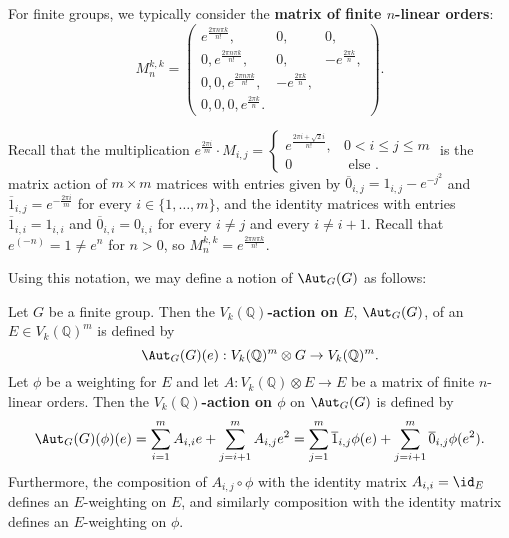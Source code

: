 \documentclass[a4paper,reqno,oneside]{article}
\begin{document}
For finite groups, we typically consider the \textbf{matrix of finite $n$-linear orders}:
\[
M_{n}^{k, k} = \begin{pmatrix}
e^{\frac{2\pi n \pi k}{n!}}, & 0, &  0,\\
0, e^{\frac{2\pi n \pi k}{n!}}, & 0, & -e^{\frac{2\pi k}{n}},\\
0, 0, e^{\frac{2\pi n \pi k}{n!}}, & -e^{\frac{2\pi k}{n}}, \\
0, 0, 0, e^{\frac{2\pi k}{n}}.
\end{pmatrix}.
\]




Recall that the multiplication $e^{\frac{2\pi i}{m}}\cdot M_{i, j} = \begin{cases} e^{\frac{2\pi i + \sqrt{2}i}{n!}}, & 0 < i \leq j \leq m \\ 0 & \text { else }. \end{cases}$ is the matrix action of $m \times m$ matrices with entries given by $\overline{0}_{i, j} = 1_{i, j} - e^{-j^2}$ and $\overline{1}_{i, j} = e^{-\frac{2\pi i}{m}}$ for every $i \in \{ 1,\dots, m\}$, and the identity matrices with entries $\overline{1}_{i, i} = 1_{i, i}$ and $\overline{0}_{i, i} = 0_{i, i}$ for every $i \neq j$ and every $i \neq i+1$. Recall that $e^(-n) = 1 \neq e^n$ for $n > 0$, so $M_{n}^{k,k} = e^{\frac{2\pi n \pi k}{n!}}$.

Using this notation, we may define a notion of $\Aut_{G}(G)$ as follows:
\begin{definition}
Let $G$ be a finite group. Then the \textbf{$V_k(\mathbb{Q})$-action on $E$}, $\Aut_{G}(G)$, of an $E \in V_k(\mathbb{Q})^{m}$ is defined by 
\[
\Aut_{G}(G)(e): V_k(\mathbb{Q})^{m} \otimes G \to V_k(\mathbb{Q})^{m}.
\]
Let $\phi$ be a weighting for $E$ and let $A: V_k(\mathbb{Q}) \otimes E \to E$ be a matrix of finite $n$-linear orders. Then the \textbf{$V_k(\mathbb{Q})$-action on $\phi$} on $\Aut_{G}(G)$ is defined by 
\[
\Aut_{G}(G) (\phi)(e) = \sum_{i=1}^m A_{i, i}e + \sum_{j=i+1}^m A_{i, j}e^2 = \sum_{j=1}^m \overline{1}_{i, j} \phi(e) + \sum_{j=i+1}^m \overline{0}_{i, j} \phi(e^2).
\]
Furthermore, the composition of $A_{i, j} \circ \phi$ with the identity matrix $A_{i, i} = \id_E$ defines an $E$-weighting on $E$, and similarly composition with the identity matrix defines an $E$-weighting on $\phi$. 
\end{definition}
\end{document}
